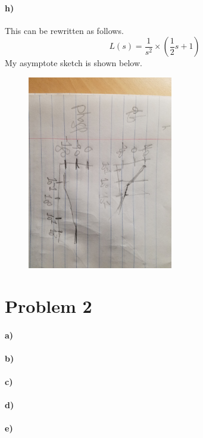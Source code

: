 \documentclass[12pt]{article}
\begin{document}
\paragraph{h)}
This can be rewritten as follows.
\[L(s)=\frac{1}{s^2}\times\left(\frac{1}{2}s+1\right)\]
My asymptote sketch is shown below.
\begin{figure}[H]
    \begin{center}
        \includegraphics[width=2.5in]{problem1h.jpg}
    \end{center}
\end{figure}

\section*{Problem 2}

\paragraph{a)}

\paragraph{b)}

\paragraph{c)}

\paragraph{d)}

\paragraph{e)}
\end{document}
